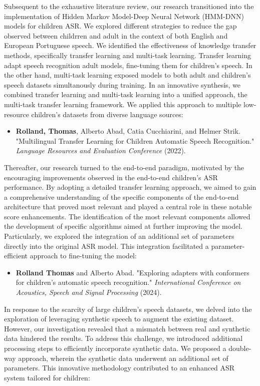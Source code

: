 Subsequent to the exhaustive literature review, our research transitioned into the implementation of Hidden Markov Model-Deep Neural Network (HMM-DNN) models for children ASR.  We explored different strategies to reduce the gap observed between childrren and adult in the context of both English and European Portuguese speech. We identified the effectiveness of knowledge transfer methods, specifically transfer learning and multi-task learning. Transfer learning adapt speech recognition adult models, fine-tuning them for children's speech. In the other hand, multi-task learning exposed models to both adult and children's speech datasets simultanously during training. In an innovative synthesis, we combined transfer learning and multi-task learning into a unified approach, the multi-task transfer learning framework. We applied this approach to multiple low-resource children's datasets from diverse language sources:
\begin{itemize}
    \item \textbf{Rolland, Thomas}, Alberto Abad, Catia Cucchiarini, and Helmer Strik. "Multilingual Transfer Learning for Children Automatic Speech Recognition." \textit{ Language Resources and Evaluation Conference} (2022).
\end{itemize}

Thereafter, our research turned to the end-to-end paradigm, motivated by the encouraging improvements observed in the end-to-end children's ASR performance. By adopting a detailed transfer learning approach, we aimed to gain a comprehensive understanding of the specific components of the end-to-end architecture that proved most relevant and played a central role in these notable score enhancements. The identification of the most relevant components allowed the development of specific algorithms aimed at further improving the model. Particularly, we explored the integration of an additional set of parameters directly into the original ASR model. This integration facilitated a parameter-efficient approach to fine-tuning the model:

\begin{itemize}
    \item \textbf{Rolland Thomas} and Alberto Abad. "Exploring adapters with conformers for children’s automatic speech recognition." \textit{ International Conference on Acoustics, Speech and Signal Processing} (2024).
\end{itemize}

In response to the scarcity of large children's speech datasets, we delved into the exploration of leveraging synthetic speech to augment the existing dataset. However, our investigation revealed that a mismatch between real and synthetic data hindered the results. To address this challenge, we introduced additional processing steps to efficiently incorporate synthetic data. We proposed a double-way approach, wherein the synthetic data underwent an additional set of parameters. This innovative methodology contributed to an enhanced ASR system tailored for children:

